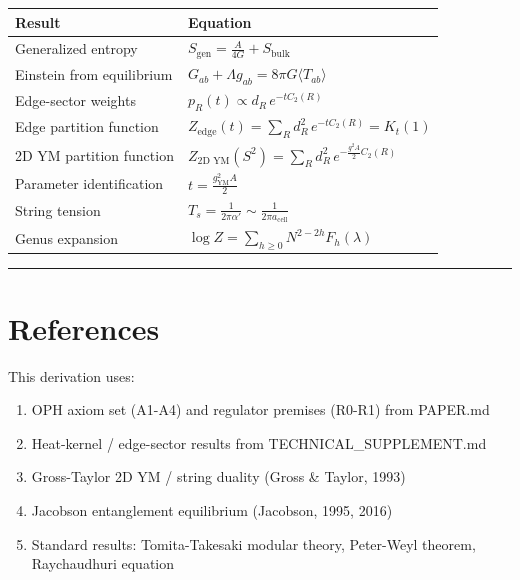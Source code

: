 {\def\LTcaptype{none} %
\begin{longtable}[]{@{}ll@{}}
\toprule\noalign{}
Result & Equation \\
\midrule\noalign{}
\endhead
\bottomrule\noalign{}
\endlastfoot
Generalized entropy & \(S_{\text{gen}} = \frac{A}{4G} + S_{\text{bulk}}\) \\
Einstein from equilibrium & \(G_{ab} + \Lambda g_{ab} = 8\pi G \langle T_{ab} \rangle\) \\
Edge-sector weights & \(p_R(t) \propto d_R \, e^{-t C_2(R)}\) \\
Edge partition function & \(Z_{\text{edge}}(t) = \sum_R d_R^2 \, e^{-t C_2(R)} = K_t(1)\) \\
2D YM partition function & \(Z_{\text{2D YM}}(S^2) = \sum_R d_R^2 \, e^{-\frac{g^2 A}{2} C_2(R)}\) \\
Parameter identification & \(t = \frac{g_{\text{YM}}^2 A}{2}\) \\
String tension & \(T_s = \frac{1}{2\pi\alpha'} \sim \frac{1}{2\pi a_{\text{cell}}}\) \\
Genus expansion & \(\log Z = \sum_{h \geq 0} N^{2-2h} F_h(\lambda)\) \\
\end{longtable}
}

\begin{center}\rule{0.5\linewidth}{0.5pt}\end{center}

\section{References}\label{references}

This derivation uses:

\begin{enumerate}
\def\labelenumi{\arabic{enumi}.}
\tightlist
\item
  OPH axiom set (A1-A4) and regulator premises (R0-R1) from PAPER.md
\item
  Heat-kernel / edge-sector results from TECHNICAL\_SUPPLEMENT.md
\item
  Gross-Taylor 2D YM / string duality (Gross \& Taylor, 1993)
\item
  Jacobson entanglement equilibrium (Jacobson, 1995, 2016)
\item
  Standard results: Tomita-Takesaki modular theory, Peter-Weyl theorem, Raychaudhuri equation
\end{enumerate}
